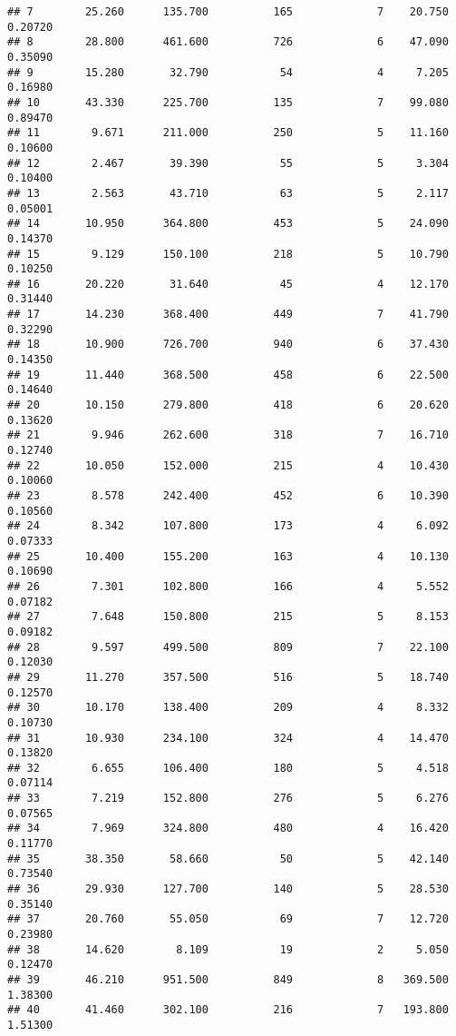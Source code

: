 \documentclass[]{article}
\begin{document}
\begin{verbatim}
## 7        25.260      135.700          165             7    20.750 0.20720
## 8        28.800      461.600          726             6    47.090 0.35090
## 9        15.280       32.790           54             4     7.205 0.16980
## 10       43.330      225.700          135             7    99.080 0.89470
## 11        9.671      211.000          250             5    11.160 0.10600
## 12        2.467       39.390           55             5     3.304 0.10400
## 13        2.563       43.710           63             5     2.117 0.05001
## 14       10.950      364.800          453             5    24.090 0.14370
## 15        9.129      150.100          218             5    10.790 0.10250
## 16       20.220       31.640           45             4    12.170 0.31440
## 17       14.230      368.400          449             7    41.790 0.32290
## 18       10.900      726.700          940             6    37.430 0.14350
## 19       11.440      368.500          458             6    22.500 0.14640
## 20       10.150      279.800          418             6    20.620 0.13620
## 21        9.946      262.600          318             7    16.710 0.12740
## 22       10.050      152.000          215             4    10.430 0.10060
## 23        8.578      242.400          452             6    10.390 0.10560
## 24        8.342      107.800          173             4     6.092 0.07333
## 25       10.400      155.200          163             4    10.130 0.10690
## 26        7.301      102.800          166             4     5.552 0.07182
## 27        7.648      150.800          215             5     8.153 0.09182
## 28        9.597      499.500          809             7    22.100 0.12030
## 29       11.270      357.500          516             5    18.740 0.12570
## 30       10.170      138.400          209             4     8.332 0.10730
## 31       10.930      234.100          324             4    14.470 0.13820
## 32        6.655      106.400          180             5     4.518 0.07114
## 33        7.219      152.800          276             5     6.276 0.07565
## 34        7.969      324.800          480             4    16.420 0.11770
## 35       38.350       58.660           50             5    42.140 0.73540
## 36       29.930      127.700          140             5    28.530 0.35140
## 37       20.760       55.050           69             7    12.720 0.23980
## 38       14.620        8.109           19             2     5.050 0.12470
## 39       46.210      951.500          849             8   369.500 1.38300
## 40       41.460      302.100          216             7   193.800 1.51300

\end{verbatim}
\end{document}
